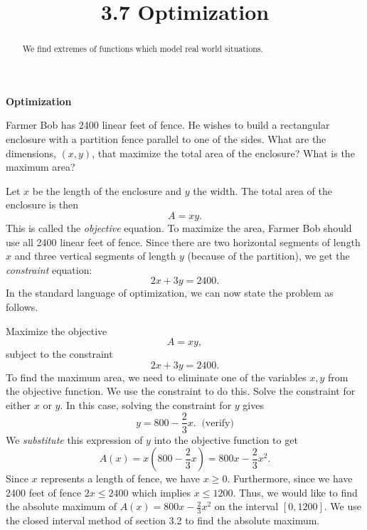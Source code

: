 \documentclass[handout]{ximera}
\title{3.7 Optimization}
\begin{document}
\begin{abstract}
We find extremes of functions which model real world situations.
\end{abstract}

\maketitle

\begin{center}
\textbf{Optimization}
\end{center}
 

\begin{example}[example 1]
Farmer Bob has 2400 linear feet of fence. He wishes to build a rectangular enclosure with a partition fence 
parallel to one of the sides.  
What are the dimensions, $(x,y)$, that maximize the total area of the enclosure? What is the maximum area?


\begin{image}
\end{image}
Let $x$ be the length of the enclosure and $y$ the width.  The total area of the enclosure is then
\[A= xy.\]
This is called the {\it objective} equation.
To maximize the area, Farmer Bob should use all 2400 linear feet of fence.  Since there are two horizontal 
segments of length $x$ and three vertical segments of length $y$ (because of the partition), we 
get the {\it constraint} equation:
\[2x+3y=2400.\]
In the standard language of optimization, we can now state the problem as follows.

Maximize the objective
\[A = xy,\]
subject to the constraint 
\[2x+3y = 2400.\]
To find the maximum area, we need to eliminate one of the variables $x, y$ from the objective function.
We use the constraint to do this.  Solve the constraint for either $x$ or $y$.
In this case, solving the constraint for $y$ gives
\[y = 800 - \frac23 x. \;\; \text{(verify)}\]
We {\it substitute} this expression of $y$ into the objective function to get 
\[A(x) = x\left(800 - \frac23 x\right) = 800x - \frac23 x^2.\]
Since $x$ represents a length of fence, we have $x \geq 0$. Furthermore, since we have 2400 feet of 
fence $2x \leq 2400$ which implies $x\leq 1200$.
Thus, we would like to find the absolute maximum of $A(x) = 800x - \frac23 x^2$ on the interval $[0, 1200]$.
We use the closed interval method of section 3.2 to find the absolute maximum.


\end{example}
\end{document}
